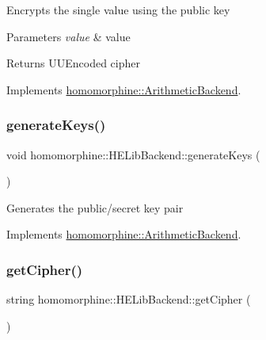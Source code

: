 Encrypts the single value using the public key


\begin{DoxyParams}{Parameters}
{\em value} & value \\
\hline
\end{DoxyParams}
\begin{DoxyReturn}{Returns}
U\+U\+Encoded cipher 
\end{DoxyReturn}


Implements \mbox{\hyperlink{classhomomorphine_1_1_arithmetic_backend_ad6aedf61ae1a6257e81bd415ec08ac17}{homomorphine\+::\+Arithmetic\+Backend}}.

\mbox{\label{classhomomorphine_1_1_h_e_lib_backend_a2c6ed82eeb597b99ae6cdb2734412a0f}} 
\subsubsection{\texorpdfstring{generateKeys()}{generateKeys()}}
{\footnotesize\ttfamily void homomorphine\+::\+H\+E\+Lib\+Backend\+::generate\+Keys (\begin{DoxyParamCaption}{ }\end{DoxyParamCaption})\hspace{0.3cm}{\ttfamily [virtual]}}

Generates the public/secret key pair 

Implements \mbox{\hyperlink{classhomomorphine_1_1_arithmetic_backend_a5faa0089b80be5629d4a0a7a02fe3568}{homomorphine\+::\+Arithmetic\+Backend}}.

\mbox{\label{classhomomorphine_1_1_h_e_lib_backend_a9ba4311289e3b8c47f389f4f44de7d5d}} 
\subsubsection{\texorpdfstring{getCipher()}{getCipher()}}
{\footnotesize\ttfamily string homomorphine\+::\+H\+E\+Lib\+Backend\+::get\+Cipher (\begin{DoxyParamCaption}{ }\end{DoxyParamCaption})\hspace{0.3cm}{\ttfamily [virtual]}}

